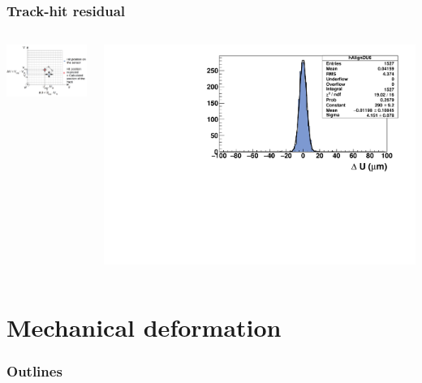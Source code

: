 \documentclass{beamer}
\begin{document}
\begin{frame}
    \frametitle{Track-hit residual}

    \begin{columns}[c]
    \hspace{-0.8cm}
      \begin{column}{7cm}
        \begin{flushleft}
          \includegraphics[width = 7cm]{Pictures/residual_explanation.png}
        \end{flushleft}
      \end{column}
    \hspace{-0.8cm}
      \begin{column}{4cm}
        \centering
        \includegraphics[width = 1.2\textwidth ]{Pictures/deltaU_6_normal_incidence.pdf}
      \end{column}
    \end{columns}
\end{frame}

\section{Mechanical deformation}
\begin{frame}
  \frametitle{Outlines}
  \begin{minipage}{\textwidth}
    \tableofcontents[currentsection,hideothersubsections, 
    sectionstyle=show/shaded]
  \end{minipage}
\end{frame}
\end{document}
